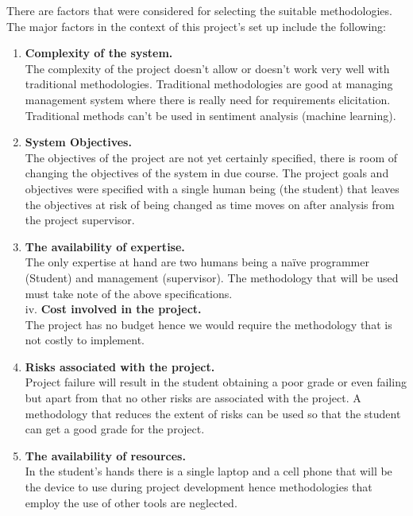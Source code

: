 \documentclass[12pt]{report}
\begin{document}
	There are factors that were considered for selecting the suitable methodologies. The major factors in the context of this project’s set up include the following:\\
	\begin{enumerate}
		\item \textbf{Complexity of the system.}\\
		The complexity of the project doesn’t allow or doesn’t work very well with traditional methodologies. Traditional methodologies are good at managing management system where there is really need for requirements elicitation. Traditional methods can’t be used in sentiment analysis (machine learning).\\
		
		\item \textbf{System Objectives.}\\
		The objectives of the project are not yet certainly specified, there is room of changing the objectives of the system in due course. The project goals and objectives were specified with a single human being (the student) that leaves the objectives at risk of being changed as time moves on after analysis from the project supervisor.\\
		
		\item \textbf{The availability of expertise.}\\
		The only expertise at hand are two humans being a naïve programmer (Student) and management (supervisor). The methodology that will be used must take note of the above specifications.\\
		
		iv.	\textbf{Cost involved in the project.}\\
		The project has no budget hence we would require the methodology that is not costly to implement.\\
		
		\item \textbf{Risks associated with the project.}\\
		Project failure will result in the student obtaining a poor grade or even failing but apart from that no other risks are associated with the project. A methodology that reduces the extent of risks can be used so that the student can get a good grade for the project.\\
		
		\item \textbf{The availability of resources.}\\
		In the student’s hands there is a single laptop and a cell phone that will be the device to use during project development hence methodologies that employ the use of other tools are neglected.\\
	\end{enumerate}
\end{document}
